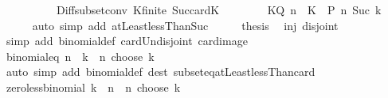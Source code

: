 \begin{isabellebody}
\ \ \ \ \ \ \ \ \ \ Diff{\isacharunderscore}{\kern0pt}subset{\isacharunderscore}{\kern0pt}conv\ K{\isacharunderscore}{\kern0pt}finite\ Suc{\isacharunderscore}{\kern0pt}card{\isacharunderscore}{\kern0pt}K{\isacharparenright}{\kern0pt}\isanewline
\ \ \isamarkupfalse%
\isanewline
\ \ \isamarkupfalse%
\ \isamarkupfalse%
\ {\isachardoublequoteopen}{\isacharbraceleft}{\kern0pt}K{\isasymin}{\isacharquery}{\kern0pt}Q{\isachardot}{\kern0pt}\ n\ {\isasymnotin}\ K{\isacharbraceright}{\kern0pt}\ {\isacharequal}{\kern0pt}\ {\isacharquery}{\kern0pt}P\ n\ {\isacharparenleft}{\kern0pt}Suc\ k{\isacharparenright}{\kern0pt}{\isachardoublequoteclose}\isanewline
\ \ \ \ \isamarkupfalse%
\ {\isacharparenleft}{\kern0pt}auto\ simp\ add{\isacharcolon}{\kern0pt}\ atLeast{}{\isacharunderscore}{\kern0pt}lessThan{\isacharunderscore}{\kern0pt}Suc{\isacharparenright}{\kern0pt}\isanewline
\ \ \isamarkupfalse%
\ \isamarkupfalse%
\ {\isacharquery}{\kern0pt}thesis\ \isamarkupfalse%
\ inj\ disjoint\isanewline
\ \ \ \ \isamarkupfalse%
\ {\isacharparenleft}{\kern0pt}simp\ add{\isacharcolon}{\kern0pt}\ binomial{\isacharunderscore}{\kern0pt}def\ card{\isacharunderscore}{\kern0pt}Un{\isacharunderscore}{\kern0pt}disjoint\ card{\isacharunderscore}{\kern0pt}image{\isacharparenright}{\kern0pt}\isanewline
{}\isamarkupfalse%
%
\endisatagproof
{\isafoldproof}%
%
\isadelimproof
\isanewline
%
\endisadelimproof
\isanewline
{}\isamarkupfalse%
\ binomial{\isacharunderscore}{\kern0pt}eq{\isacharunderscore}{\kern0pt}{}{\isacharcolon}{\kern0pt}\ {\isachardoublequoteopen}n\ {\isacharless}{\kern0pt}\ k\ {\isasymLongrightarrow}\ n\ choose\ k\ {\isacharequal}{\kern0pt}\ {}{\isachardoublequoteclose}\isanewline
%
\isadelimproof
\ \ %
\endisadelimproof
%
\isatagproof
{}\isamarkupfalse%
\ {\isacharparenleft}{\kern0pt}auto\ simp\ add{\isacharcolon}{\kern0pt}\ binomial{\isacharunderscore}{\kern0pt}def\ dest{\isacharcolon}{\kern0pt}\ subset{\isacharunderscore}{\kern0pt}eq{\isacharunderscore}{\kern0pt}atLeast{}{\isacharunderscore}{\kern0pt}lessThan{\isacharunderscore}{\kern0pt}card{\isacharparenright}{\kern0pt}%
\endisatagproof
{\isafoldproof}%
%
\isadelimproof
\isanewline
%
\endisadelimproof
\isanewline
{}\isamarkupfalse%
\ zero{\isacharunderscore}{\kern0pt}less{\isacharunderscore}{\kern0pt}binomial{\isacharcolon}{\kern0pt}\ {\isachardoublequoteopen}k\ {\isasymle}\ n\ {\isasymLongrightarrow}\ n\ choose\ k\ {\isachargreater}{\kern0pt}\ {}{\isachardoublequoteclose}\isanewline

\end{isabellebody}
